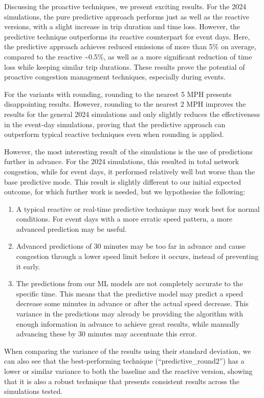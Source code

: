 Discussing the proactive techniques, we present exciting results. For the 2024 simulations, the pure predictive approach performs just as well as the reactive versions, with a slight increase in trip duration and time loss. However, the predictive technique outperforms its reactive counterpart for event days. Here, the predictive approach achieves reduced emissions of more than 5\% on average, compared to the reactive \~{}0.5\%, as well as a more significant reduction of time loss while keeping similar trip durations. These results prove the potential of proactive congestion management techniques, especially during events.

For the variants with rounding, rounding to the nearest 5 MPH presents disappointing results. However, rounding to the nearest 2 MPH improves the results for the general 2024 simulations and only slightly reduces the effectiveness in the event-day simulations, proving that the predictive approach can outperform typical reactive techniques even when rounding is applied.

However, the most interesting result of the simulations is the use of predictions further in advance. For the 2024 simulations, this resulted in total network congestion, while for event days, it performed relatively well but worse than the base predictive mode. This result is slightly different to our initial expected outcome, for which further work is needed, but we hypothesise the following:
\begin{enumerate}
    \item A typical reactive or real-time predictive technique may work best for normal conditions. For event days with a more erratic speed pattern, a more advanced prediction may be useful.
    \item Advanced predictions of 30 minutes may be too far in advance and cause congestion through a lower speed limit before it occurs, instead of preventing it early.
    \item The predictions from our ML models are not completely accurate to the specific time. This means that the predictive model may predict a speed decrease some minutes in advance or after the actual speed decrease. This variance in the predictions may already be providing the algorithm with enough information in advance to achieve great results, while manually advancing these by 30 minutes may accentuate this error.
\end{enumerate}

When comparing the variance of the results using their standard deviation, we can also see that the best-performing technique (“predictive\_round2”) has a lower or similar variance to both the baseline and the reactive version, showing that it is also a robust technique that presents consistent results across the simulations tested.

